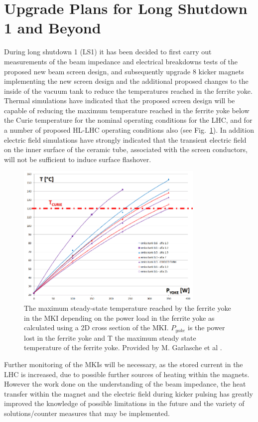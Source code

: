 \section{Upgrade Plans for Long Shutdown 1 and Beyond}

During long shutdown 1 (LS1) it has been decided to first carry out measurements of the beam impedance and electrical breakdowns tests of the proposed new beam screen design, and subsequently upgrade 8 kicker magnets implementing the new screen design and the additional proposed changes to the inside of the vacuum tank to reduce the temperatures reached in the ferrite yoke. Thermal simulations have indicated that the proposed screen design will be capable of reducing the maximum temperature reached in the ferrite yoke below the Curie temperature for the nominal operating conditions for the LHC, and for a number of proposed HL-LHC operating conditions also (see Fig.~\ref{fig:pow-loss-stable-temp-mkis}). In addition electric field simulations have strongly indicated that the transient electric field on the inner surface of the ceramic tube, associated with the screen conductors, will not be sufficient to induce surface flashover. 


\begin{figure}
\begin{center}
\includegraphics[width=0.8\textwidth]{LHC_MKI/figures/tempPowMarco.png}
\end{center}
\caption{The maximum steady-state temperature reached by the ferrite yoke in the MKI depending on the power load in the ferrite yoke as calculated using a 2D cross section of the MKI. $P_{yoke}$ is the power lost in the ferrite yoke and T the maximum steady state temperature of the ferrite yoke. Provided by M. Garlasche et al \cite{Garlasche:2dHeatEmisAll}.}
\label{fig:pow-loss-stable-temp-mkis}
\end{figure} 

Further monitoring of the MKIs will be necessary, as the stored current in the LHC is increased, due to possible further sources of heating within the magnets. However the work done on the understanding of the beam impedance, the heat transfer within the magnet and the electric field during kicker pulsing has greatly improved the knowledge of possible limitations in the future and the variety of solutions/counter measures that may be implemented. 